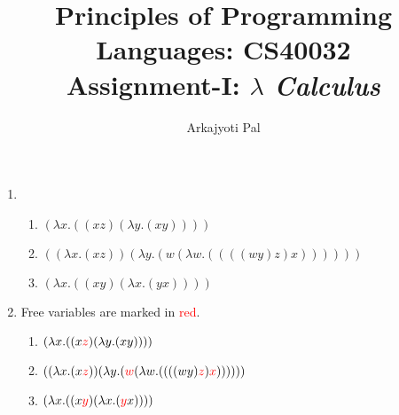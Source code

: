 \documentclass[11pt]{article}
\begin{document}
\author{Arkajyoti Pal}
\title{Principles of Programming Languages: CS40032 \\ Assignment-I: \textit{$\lambda$ Calculus}}
\maketitle

\medskip


\begin{enumerate}
    \item \begin{enumerate}
        \item  $(\lambda x.((x z) (\lambda y.(x y))))$
        \item $((\lambda x.(x z)) ( \lambda y.(w (\lambda w.((((w y) z) x))))))$
        \item $(\lambda x.((x y) (\lambda x.(y x))))$
    \end{enumerate}
    \item Free variables are marked in \textcolor{red}{red}.
    \begin{enumerate}
        \item $(\lambda x.((x \textcolor{red}{z}) (\lambda y.(x y))))$
        \item $((\lambda x.(x \textcolor{red}{z})) (\lambda y.(\textcolor{red}{w} (\lambda w.((((w y) \textcolor{red}{z}) \textcolor{red}{x}))))))$
        \item $(\lambda x.((x \textcolor{red}{y}) (\lambda x.(\textcolor{red}{y} x))))$
    \end{enumerate}
    

\end{enumerate}
\end{document}

